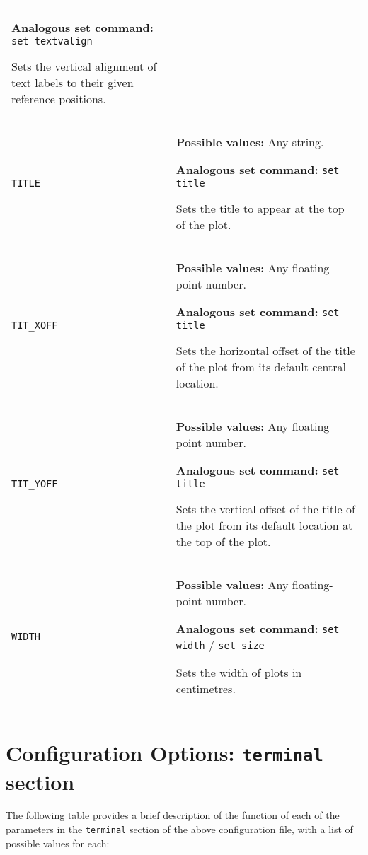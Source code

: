 \begin{longtable}{p{3.4cm}p{9cm}}
                   {\bf Analogous set command:} {\tt set textvalign}\index{set textvalign command@{\tt set textvalign} command}

                   Sets the vertical alignment of text labels to their given reference positions.
                   \\
{\tt TITLE} & {\bf Possible values:} Any string.

                   {\bf Analogous set command:} {\tt set title}\index{set title command@{\tt set title} command}

                   Sets the title to appear at the top of the plot.
                   \\
{\tt TIT\_XOFF} & {\bf Possible values:} Any floating point number.

                   {\bf Analogous set command:} {\tt set title}

                   Sets the horizontal offset of the title of the plot from its default central location.
                   \\
{\tt TIT\_YOFF} & {\bf Possible values:} Any floating point number.

                   {\bf Analogous set command:} {\tt set title}

                   Sets the vertical offset of the title of the plot from its default location at the top of the plot.
                   \\
{\tt WIDTH} & {\bf Possible values:} Any floating-point number.

                   {\bf Analogous set command:} {\tt set width} / {\tt set size}\index{set width command@{\tt set width} command}\index{set size command@{\tt set size} command}

                   Sets the width of plots in centimetres.
                   \\
\end{longtable}

\section{Configuration Options: {\tt terminal} section}
\label{configfile_terminal}

The following table provides a brief description of the function of each of the
parameters in the {\tt terminal} section of the above configuration file,
with a list of possible values for each:

